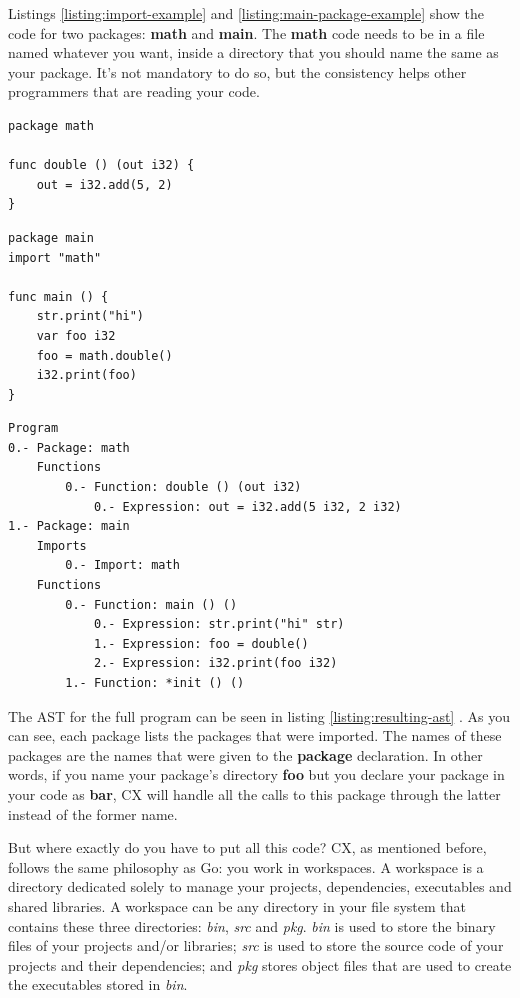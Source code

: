 \documentclass[11pt,fleqn,openany]{book} %
\begin{document}
Listings \ref{listing:import-example} and \ref{listing:main-package-example} show the code for two packages: \textbf{math} and \textbf{main}. The \textbf{math} code needs to be in a file named whatever you want, inside a directory that you should name the same as your package. It's not mandatory to do so, but the consistency helps other programmers that are reading your code.

\begin{lstlisting}[caption={Package to be imported},captionpos=b,label={listing:import-example}]
package math

func double () (out i32) {
	out = i32.add(5, 2)
}
\end{lstlisting}

\begin{lstlisting}[caption={The 'main' package},captionpos=b,label={listing:main-package-example}]
package main
import "math"

func main () {
	str.print("hi")
	var foo i32
	foo = math.double()
	i32.print(foo)
}
\end{lstlisting}

\begin{lstlisting}[caption={Abstract syntax tree of \ref{listing:main-package-example}},captionpos=b,label={listing:resulting-ast}]
Program
0.- Package: math
	Functions
		0.- Function: double () (out i32)
			0.- Expression: out = i32.add(5 i32, 2 i32)
1.- Package: main
	Imports
		0.- Import: math
	Functions
		0.- Function: main () ()
			0.- Expression: str.print("hi" str)
			1.- Expression: foo = double()
			2.- Expression: i32.print(foo i32)
		1.- Function: *init () ()
\end{lstlisting}

The AST for the full program can be seen in listing \ref{listing:resulting-ast} . As you can see, each package lists the packages that were imported. The names of these packages are the names that were given to the \textbf{package} declaration. In other words, if you name your package's directory \textbf{foo} but you declare your package in your code as \textbf{bar}, CX will handle all the calls to this package through the latter instead of the former name.

But where exactly do you have to put all this code? CX, as mentioned before, follows the same philosophy as Go: you work in workspaces. A workspace is a directory dedicated solely to manage your projects, dependencies, executables and shared libraries. A workspace can be any directory in your file system that contains these three directories: \emph{bin}, \emph{src} and \emph{pkg}. \emph{bin} is used to store the binary files of your projects and/or libraries; \emph{src} is used to store the source code of your projects and their dependencies; and \emph{pkg} stores object files that are used to create the executables stored in \emph{bin}.
\end{document}
